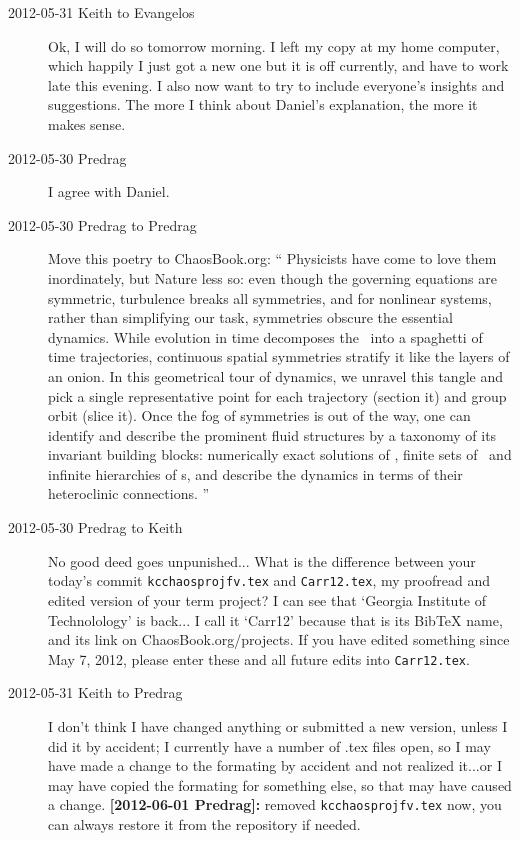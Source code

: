 \begin{description}
\item[2012-05-31 Keith to Evangelos] Ok, I will do so tomorrow morning.
I left my copy at my home computer, which happily I just got a new one
but it is off currently, and have to work late this evening.  I also now
want to try to include everyone's insights and suggestions.  The more I
think about Daniel's explanation, the more it makes sense.

\item[2012-05-30 Predrag] I agree with Daniel.

\item[2012-05-30 Predrag  to Predrag]             %
Move this poetry to ChaosBook.org:
``
Physicists have come to love them inordinately, but Nature less so: even
though the governing equations are symmetric, turbulence breaks all
symmetries, and for nonlinear systems, rather than simplifying our task,
symmetries obscure the essential dynamics.
While evolution in time decomposes the \statesp\ into a spaghetti of time
trajectories, continuous spatial symmetries stratify it like the layers
of an onion. In this geometrical tour of dynamics, we unravel this tangle
and pick a single representative point for each trajectory (section it)
and  group orbit (slice it). Once the fog of symmetries is out of the
way, one can identify and describe the prominent fluid structures by a
taxonomy of its invariant building blocks: numerically exact solutions of
\NSe, finite sets of \reqva\ and infinite hierarchies of \rpo s, and
describe the dynamics in terms of their heteroclinic connections.
''

\item[2012-05-30 Predrag  to Keith] No good deed goes unpunished... What
is the difference between your today's commit \texttt{kcchaosprojfv.tex}
and \texttt{Carr12.tex}, my {\color{red}proofread} and edited version of
your term project? I can see that `Georgia Institute of Technolology' is
back... I call it `Carr12' because that is its BibTeX name, and its link
on ChaosBook.org/projects. If you have edited something since May 7,
2012, please enter these and all future edits into \texttt{Carr12.tex}.

\item[2012-05-31 Keith to Predrag]  I don't think I have changed anything
or submitted a new version, unless I did it by accident; I currently have
a number of .tex files open, so I may have made a change to the formating
by accident and not realized it...or I may have copied the formating for
something else, so that may have caused a change.
{\bf [2012-06-01 Predrag]:} removed \texttt{kcchaosprojfv.tex} now, you
can always restore it from the repository if needed.


\end{description}
